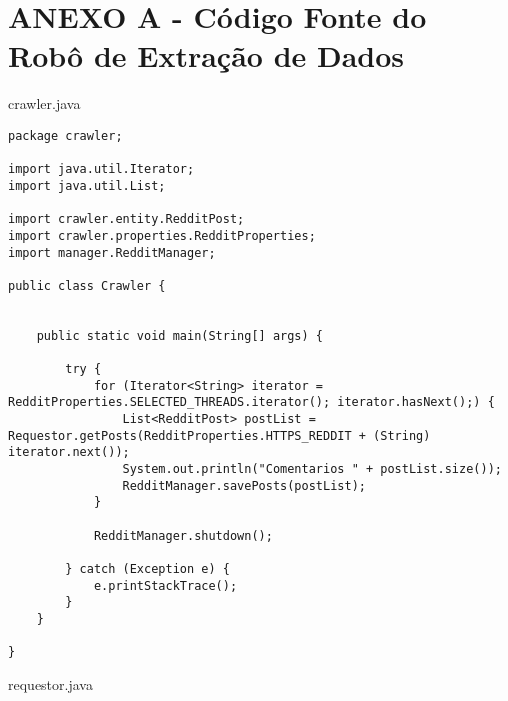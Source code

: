 \chapter{ANEXO A - Código Fonte do Robô de Extração de Dados}
\label{cap:anexoa}


crawler.java 

\begin{lstlisting}
package crawler;

import java.util.Iterator;
import java.util.List;

import crawler.entity.RedditPost;
import crawler.properties.RedditProperties;
import manager.RedditManager;

public class Crawler {

	
	public static void main(String[] args) {
		
		try {
			for (Iterator<String> iterator = RedditProperties.SELECTED_THREADS.iterator(); iterator.hasNext();) {
				List<RedditPost> postList = Requestor.getPosts(RedditProperties.HTTPS_REDDIT + (String) iterator.next());
				System.out.println("Comentarios " + postList.size());
				RedditManager.savePosts(postList);
			}
			
			RedditManager.shutdown();
			
		} catch (Exception e) {
			e.printStackTrace();
		}
	}

}
\end{lstlisting}

requestor.java

